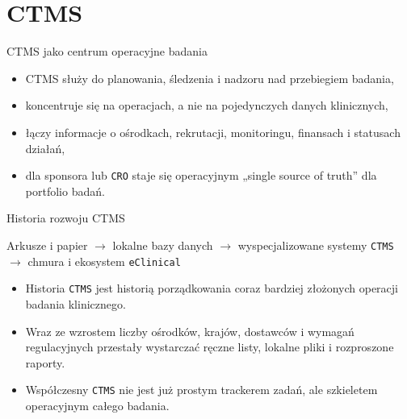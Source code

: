 \section{CTMS}


\begin{frame}{CTMS jako centrum operacyjne badania}
  \begin{itemize}
    \item CTMS służy do planowania, śledzenia i nadzoru nad przebiegiem badania,
    \item koncentruje się na operacjach, a nie na pojedynczych danych klinicznych,
    \item łączy informacje o ośrodkach, rekrutacji, monitoringu, finansach i statusach działań,
    \item dla sponsora lub \texttt{CRO} staje się operacyjnym „single source of truth” dla portfolio badań.
  \end{itemize}
\end{frame}

\begin{frame}{Historia rozwoju CTMS}
  \begin{center}
    \Large
    Arkusze i papier $\rightarrow$ lokalne bazy danych $\rightarrow$ wyspecjalizowane systemy \texttt{CTMS} $\rightarrow$ chmura i ekosystem \texttt{eClinical}
  \end{center}

  \vspace{0.45cm}

  \begin{itemize}
    \item Historia \texttt{CTMS} jest historią porządkowania coraz bardziej złożonych operacji badania klinicznego.
    \item Wraz ze wzrostem liczby ośrodków, krajów, dostawców i wymagań regulacyjnych przestały wystarczać ręczne listy, lokalne pliki i rozproszone raporty.
    \item Współczesny \texttt{CTMS} nie jest już prostym trackerem zadań, ale szkieletem operacyjnym całego badania.
  \end{itemize}
\end{frame}

